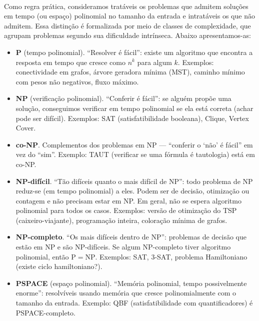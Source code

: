 \documentclass[12pt,a4paper]{article}
\def\emph#1{#1}%
\begin{document}
\paragraph{}
 Como regra prática, consideramos \emph{tratáveis} os problemas que admitem soluções em tempo (ou espaço) \emph{polinomial} no tamanho da entrada e \emph{intratáveis} os que não admitem. Essa distinção é formalizada por meio de \emph{classes de complexidade}, que agrupam problemas segundo sua dificuldade intrínseca. Abaixo apresentamos-as:

\begin{itemize}\setlength{\itemsep}{2pt}
    \item \textbf{P} (tempo polinomial). “Resolver é fácil”: existe um algoritmo que encontra a resposta em tempo que cresce como \(n^k\) para algum \(k\). Exemplos: conectividade em grafos, árvore geradora mínima (MST), caminho mínimo com pesos não negativos, fluxo máximo.
    \item \textbf{NP} (verificação polinomial). “Conferir é fácil”: se alguém propõe uma solução, conseguimos \emph{verificar} em tempo polinomial se ela está correta (achar pode ser difícil). Exemplos: \emph{SAT} (satisfatibilidade booleana), \emph{Clique}, \emph{Vertex Cover}.
    \item \textbf{co-NP}. Complementos dos problemas em NP — “conferir o ‘não’ é fácil” em vez do “sim”. Exemplo: \emph{TAUT} (verificar se uma fórmula é tautologia) está em co-NP.
    \item \textbf{NP-difícil}. “Tão difíceis quanto o mais difícil de NP”: todo problema de NP reduz-se (em tempo polinomial) a eles. Podem ser de decisão, otimização ou contagem e \emph{não precisam} estar em NP. Em geral, não se espera algoritmo polinomial para todos os casos. Exemplos: versão de otimização do \emph{TSP} (caixeiro-viajante), programação inteira, coloração mínima de grafos.
    \item \textbf{NP-completo}. “Os mais difíceis \emph{dentro} de NP”: problemas de decisão que estão em NP e são NP-difíceis. Se algum NP-completo tiver algoritmo polinomial, então \(\mathrm{P}=\mathrm{NP}\). Exemplos: \emph{SAT}, \emph{3-SAT}, problema \emph{Hamiltoniano} (existe ciclo hamiltoniano?).
    \item \textbf{PSPACE} (espaço polinomial). “Memória polinomial, tempo possivelmente enorme”: resolvíveis usando memória que cresce polinomialmente com o tamanho da entrada. Exemplo: \emph{QBF} (satisfatibilidade com quantificadores) é PSPACE-completo.
\end{itemize}
\end{document}
